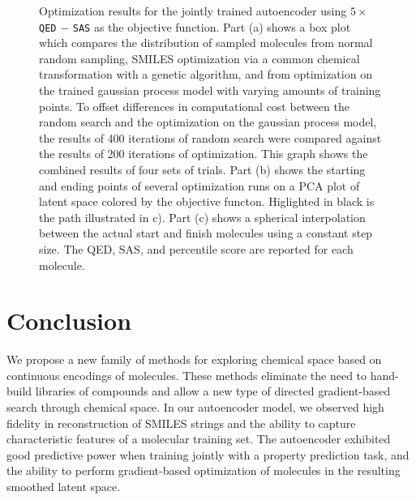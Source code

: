 \documentclass[journal=acscii,manuscript=article]{achemso}
\newcommand{\sidecaption}[1]%
{\raisebox{\abovecaptionskip}{\begin{subfigure}[t]{1.6em}
  \caption[singlelinecheck=off]{}%
  \label{#1}
\end{subfigure}}\ignorespaces}
\begin{document}
\begin{figure}[ht]
	\centering
	\sidecaption{subfig:a}
	\sidecaption{subfig:b}

	\sidecaption{subfig:c}
	
	\caption{ Optimization results for the jointly trained autoencoder using $5 \times$ \texttt{QED} $-$ \texttt{SAS} as the objective function. Part (a) shows a box plot which compares the distribution of sampled molecules from normal random sampling, SMILES optimization via a common chemical transformation with a genetic algorithm, and from optimization on the trained gaussian process model with varying amounts of training points. To offset differences in computational cost between the random search and the optimization on the gaussian process model, the results of 400 iterations of random search were compared against the results of 200 iterations of optimization. This graph shows the combined results of four sets of trials. Part (b) shows the starting and ending points of several optimization runs on a PCA plot of latent space colored by the objective functon. Higlighted in black is the path illustrated in c). Part (c) shows a spherical interpolation between the actual start and finish molecules using a constant step size. The QED, SAS, and percentile score are reported for each molecule.}
    \label{fig:optimize_mols}
\end{figure}

\section{Conclusion}
We propose a new family of methods for exploring chemical space based on continuous encodings of molecules.
These methods eliminate the need to hand-build libraries of compounds and allow a new type of directed gradient-based search through chemical space. In our autoencoder model, we observed high fidelity in reconstruction of SMILES strings and the ability to capture characteristic features of a molecular training set. The autoencoder exhibited good predictive power when training jointly with a property prediction task, and the ability to perform gradient-based optimization of molecules in the resulting smoothed latent space. 
\end{document}
